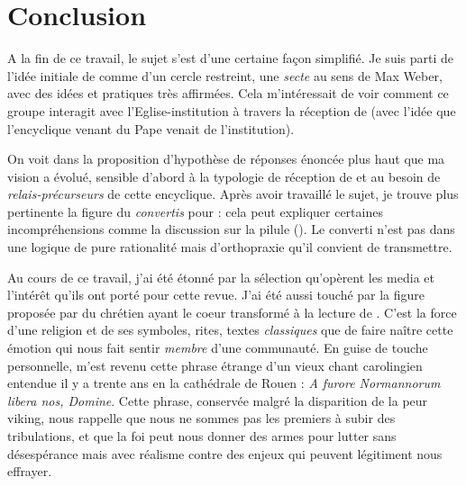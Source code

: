  





\section{Conclusion}

A la fin de ce travail, le sujet s'est d'une certaine façon simplifié. Je suis parti de l'idée initiale de \RLimite comme d'un cercle restreint, une \textit{secte} au sens de Max Weber, avec des idées et pratiques très affirmées. Cela m'intéressait de voir comment ce groupe interagit avec l'Eglise-institution à travers la réception de \LS (avec l'idée que l'encyclique venant du Pape venait de l'institution). 

On voit dans la proposition d'hypothèse de réponses énoncée plus haut que ma vision a évolué, sensible d'abord à la typologie de réception de \LS et au besoin de \textit{relais-précurseurs} de cette encyclique.
Après avoir travaillé le sujet, je trouve plus pertinente la figure du \textit{convertis} pour \RL : cela peut expliquer certaines incompréhensions comme la discussion sur la pilule  (\cite{Schlegel_2018_Limite}). Le converti n'est pas dans une logique de pure rationalité mais d'orthopraxie qu'il convient de transmettre.

Au cours de ce travail, j'ai été étonné par la sélection qu'opèrent les media et l'intérêt qu'ils ont porté pour cette revue. 
J'ai été aussi touché par la figure proposée par \cite{revol_reception_2017} du chrétien ayant le coeur transformé à la lecture de \LS. C'est la force d'une religion et de ses symboles, rites, textes \textit{classiques} que de faire naître cette émotion qui nous fait sentir \textit{membre} d'une communauté. En guise de touche personnelle, m'est revenu cette phrase étrange d'un vieux chant carolingien entendue il y a trente ans en la cathédrale de Rouen : \textit{A furore Normannorum libera nos, Domine}. Cette phrase, conservée malgré la disparition de la peur viking, nous rappelle que nous ne sommes pas les premiers à subir des tribulations, et que la foi peut nous donner des armes pour lutter sans désespérance mais avec réalisme contre des enjeux qui peuvent légitiment nous effrayer.
 
 
  




 